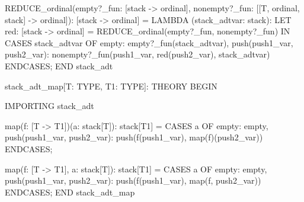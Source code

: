   REDUCE_ordinal(empty?_fun: [stack -> ordinal],
                 nonempty?_fun: [[T, ordinal, stack] -> ordinal]):
   [stack -> ordinal] =
      LAMBDA (stack_adtvar: stack):
        LET red: [stack -> ordinal] = REDUCE_ordinal(empty?_fun, nonempty?_fun)
          IN
          CASES stack_adtvar
            OF empty: empty?_fun(stack_adtvar),
               push(push1_var, push2_var):
                 nonempty?_fun(push1_var, red(push2_var), stack_adtvar)
            ENDCASES;
 END stack_adt

stack_adt_map[T: TYPE, T1: TYPE]: THEORY
 BEGIN

  IMPORTING stack_adt

  map(f: [T -> T1])(a: stack[T]):  stack[T1] =
      CASES a
        OF empty: empty,
           push(push1_var, push2_var): push(f(push1_var), map(f)(push2_var))
        ENDCASES;

  map(f: [T -> T1], a: stack[T]):  stack[T1] =
      CASES a
        OF empty: empty,
           push(push1_var, push2_var): push(f(push1_var), map(f, push2_var))
        ENDCASES;
 END stack_adt_map
